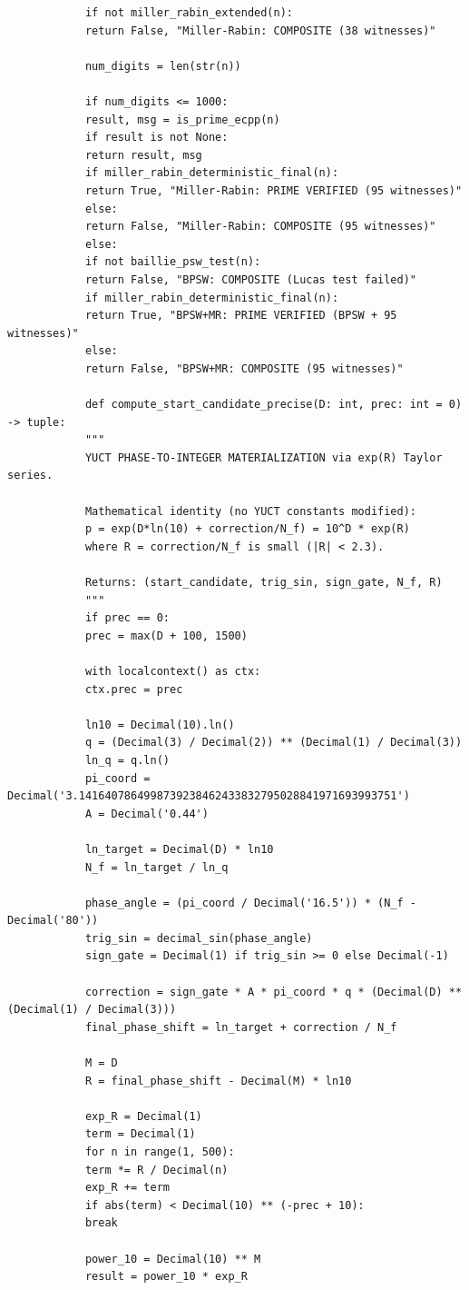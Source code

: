 \documentclass[12pt,a4paper]{article}
\theoremstyle{remark}
\begin{document}
\begin{tcolorbox}
\begin{lstlisting}
			if not miller_rabin_extended(n):
			return False, "Miller-Rabin: COMPOSITE (38 witnesses)"
			
			num_digits = len(str(n))
			
			if num_digits <= 1000:
			result, msg = is_prime_ecpp(n)
			if result is not None:
			return result, msg
			if miller_rabin_deterministic_final(n):
			return True, "Miller-Rabin: PRIME VERIFIED (95 witnesses)"
			else:
			return False, "Miller-Rabin: COMPOSITE (95 witnesses)"
			else:
			if not baillie_psw_test(n):
			return False, "BPSW: COMPOSITE (Lucas test failed)"
			if miller_rabin_deterministic_final(n):
			return True, "BPSW+MR: PRIME VERIFIED (BPSW + 95 witnesses)"
			else:
			return False, "BPSW+MR: COMPOSITE (95 witnesses)"
			
			def compute_start_candidate_precise(D: int, prec: int = 0) -> tuple:
			"""
			YUCT PHASE-TO-INTEGER MATERIALIZATION via exp(R) Taylor series.
			
			Mathematical identity (no YUCT constants modified):
			p = exp(D*ln(10) + correction/N_f) = 10^D * exp(R)
			where R = correction/N_f is small (|R| < 2.3).
			
			Returns: (start_candidate, trig_sin, sign_gate, N_f, R)
			"""
			if prec == 0:
			prec = max(D + 100, 1500)
			
			with localcontext() as ctx:
			ctx.prec = prec
			
			ln10 = Decimal(10).ln()
			q = (Decimal(3) / Decimal(2)) ** (Decimal(1) / Decimal(3))
			ln_q = q.ln()
			pi_coord = Decimal('3.1416407864998739238462433832795028841971693993751')
			A = Decimal('0.44')
			
			ln_target = Decimal(D) * ln10
			N_f = ln_target / ln_q
			
			phase_angle = (pi_coord / Decimal('16.5')) * (N_f - Decimal('80'))
			trig_sin = decimal_sin(phase_angle)
			sign_gate = Decimal(1) if trig_sin >= 0 else Decimal(-1)
			
			correction = sign_gate * A * pi_coord * q * (Decimal(D) ** (Decimal(1) / Decimal(3)))
			final_phase_shift = ln_target + correction / N_f
			
			M = D
			R = final_phase_shift - Decimal(M) * ln10
			
			exp_R = Decimal(1)
			term = Decimal(1)
			for n in range(1, 500):
			term *= R / Decimal(n)
			exp_R += term
			if abs(term) < Decimal(10) ** (-prec + 10):
			break
			
			power_10 = Decimal(10) ** M
			result = power_10 * exp_R
			

\end{lstlisting}
\end{tcolorbox}
\end{document}
